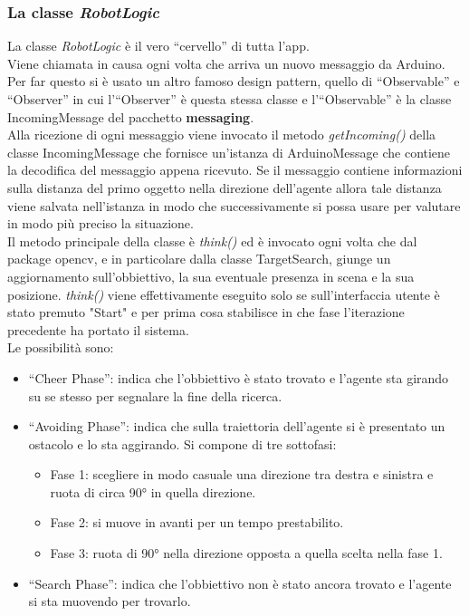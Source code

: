 \subsubsection{La classe \emph{RobotLogic}}
La classe \emph{RobotLogic} è il vero ``cervello'' di tutta l'app.\\
Viene chiamata in causa ogni volta che arriva un nuovo messaggio da Arduino. 
Per far questo si è usato un altro famoso design pattern, quello di ``Observable'' 
e ``Observer'' in cui l'``Observer'' è questa stessa classe e l'``Observable''
è la classe IncomingMessage del pacchetto \textbf{messaging}.\\
Alla ricezione di ogni messaggio viene invocato il metodo \emph{getIncoming()} 
della classe IncomingMessage che fornisce un'istanza di ArduinoMessage che contiene 
la decodifica del messaggio appena ricevuto. Se il messaggio
contiene informazioni sulla distanza del primo oggetto nella direzione dell'agente
allora tale distanza viene salvata nell'istanza in modo che successivamente si
possa usare per valutare in modo più preciso la situazione.\\
Il metodo principale della classe è \emph{think()} ed è invocato ogni volta che
dal package opencv, e in particolare dalla classe TargetSearch, giunge un aggiornamento
sull'obbiettivo, la sua eventuale presenza in scena e la sua posizione. \emph{think()}
viene effettivamente eseguito solo se sull'interfaccia utente è stato premuto "Start"
 e per prima cosa stabilisce in che fase l'iterazione precedente ha portato il sistema. \\
 Le possibilità sono:
	\begin{itemize}
	\item ``Cheer Phase'': indica che l'obbiettivo è stato trovato e l'agente sta
	girando su se stesso per segnalare la fine della ricerca.
	\item ``Avoiding Phase'': indica che sulla traiettoria dell'agente si è presentato un ostacolo e lo sta aggirando. Si compone di tre sottofasi:
	\begin{itemize}
		\item Fase 1: scegliere in modo casuale una direzione tra destra e sinistra e ruota di circa 90° in quella direzione. 
		\item Fase 2: si muove in avanti per un tempo prestabilito.
		\item Fase 3: ruota di 90° nella direzione opposta a quella scelta nella fase 1.
	\end{itemize}
	\item ``Search Phase'': indica che l'obbiettivo non è stato ancora trovato e l'agente si sta muovendo per trovarlo.
	\end{itemize}


